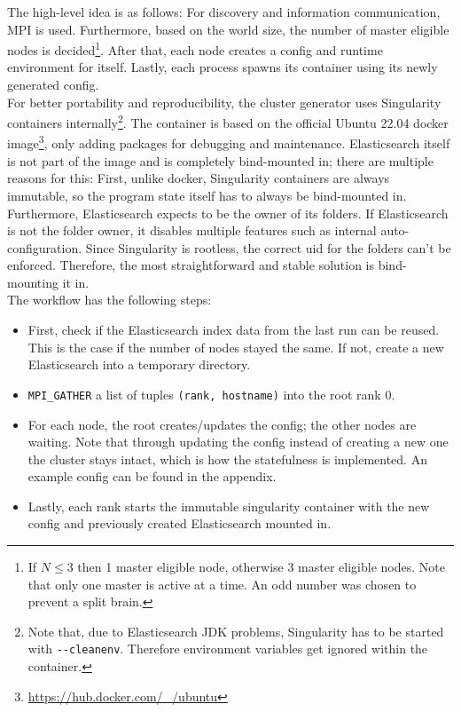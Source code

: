 The high-level idea is as follows: For discovery and information communication, \ac{MPI} is used. Furthermore, based on the world size, the number of master eligible nodes is decided\footnote{If $N \leq 3$ then 1 master eligible node, otherwise 3 master eligible nodes. Note that only one master is active at a time. An odd number was chosen to prevent a split brain.}. After that, each node creates a config and runtime environment for itself. Lastly, each process spawns its container using its newly generated config.\\

For better portability and reproducibility, the cluster generator uses Singularity containers internally\footnote{Note that, due to Elasticsearch JDK problems, Singularity has to be started with \texttt{-{}-cleanenv}. Therefore environment variables get ignored within the container.}. The container is based on the official Ubuntu 22.04 docker image\footnote{\url{https://hub.docker.com/_/ubuntu}}, only adding packages for debugging and maintenance. Elasticsearch itself is not part of the image and is completely bind-mounted in; there are multiple reasons for this: First, unlike docker, Singularity containers are always immutable, so the program state itself has to always be bind-mounted in. Furthermore, Elasticsearch expects to be the owner of its folders. If Elasticsearch is not the folder owner, it disables multiple features such as internal auto-configuration. Since Singularity is rootless, the correct uid for the folders can't be enforced. Therefore, the most straightforward and stable solution is bind-mounting it in.\\

The workflow has the following steps:
\begin{itemize}
  \item First, check if the Elasticsearch index data from the last run can be reused. This is the case if the number of nodes stayed the same. If not, create a new Elasticsearch into a temporary directory.
  \item \texttt{MPI\_GATHER} a list of tuples \texttt{(rank, hostname)} into the root rank 0.
  \item For each node, the root creates/updates the config; the other nodes are waiting. Note that through updating the config instead of creating a new one the cluster stays intact, which is how the statefulness is implemented. An example config can be found in the appendix.
  \item Lastly, each rank starts the immutable singularity container with the new config and previously created Elasticsearch mounted in.
\end{itemize}

